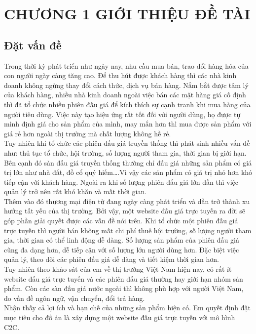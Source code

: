 \documentclass{article}
\begin{document}
\section*{CHƯƠNG 1 GIỚI THIỆU ĐỀ TÀI}
\setcounter{section}{1}
\subsection{Đặt vấn đề}
Trong thời kỳ phát triển như ngày nay, nhu cầu mua bán, trao đổi hàng hóa của con người ngày càng tăng cao. Để thu hút được khách hàng thì các nhà kinh doanh không ngừng thay đổi cách thức, dịch vụ bán hàng. Nắm bắt được tâm lý của khách hàng, nhiều nhà kinh doanh ngoài việc bán các mặt hàng giá cố định thì đã tổ chức nhiều phiên đấu giá để kích thích sự cạnh tranh khi mua hàng của người tiêu dùng. Việc này tạo hiệu ứng rất tốt đối với người dùng, họ được tự mình định giá cho sản phẩm của mình, may mắn hơn thì mua được sản phẩm với giá rẻ hơn ngoài thị trường mà chất lượng không hề rẻ. \\
Tuy nhiên khi tổ chức các phiên đấu giá truyền thống thì phát sinh nhiều vấn đề như: thủ tục tổ chức, hội trường, số lượng người tham gia, thời gian bị giới hạn. Bên cạnh đó sàn đấu giá truyền thống thường chỉ đấu giá những sản phẩm có giá trị lớn như nhà đất, đồ cổ quý hiếm….Vì vậy các sản phẩm có giá trị nhỏ hơn khó tiếp cận với khách hàng. Ngoài ra khi số lượng phiên đấu giá lớn dần thì việc quản lý trở nên rất khó khăn và mất thời gian. \\
Thêm vào đó thương mại điện tử đang ngày càng phát triển và dần trở thành xu hướng tất yếu của thị trường. Bởi vậy, một website đấu giá trực tuyến ra đời sẽ góp phần giải quyết được các vấn đề nói trên. Khi tổ chức một phiên đấu giá trực tuyến thì người bán không mất chi phí thuê hội trường, số lượng người tham gia, thời gian có thể linh động dễ dàng. Số lượng sản phẩm của phiên đấu giá cũng đa dạng hơn, dễ tiếp cận với số lượng lớn người dùng hơn. Đặc biệt việc quản lý, theo dõi các phiên đấu giá dễ dàng và tiết kiệm thời gian hơn.\\
Tuy nhiên theo khảo sát của em về thị trường Việt Nam hiện nay, có rất ít website đấu giá trực tuyến và các phiên đấu giá thường hay giới hạn nhóm sản phẩm. Còn các sàn đấu giá nước ngoài thì không phù hợp với người Việt Nam, do vấn đề ngôn ngữ, vận chuyển, đổi trả hàng.\\ 
Nhận thấy cả lợi ích và hạn chế của những sản phẩm hiện có. Em quyết định đặt mục tiêu cho đồ án là xây dựng một website đấu giá trực tuyến với mô hình C2C. 
\end{document}

